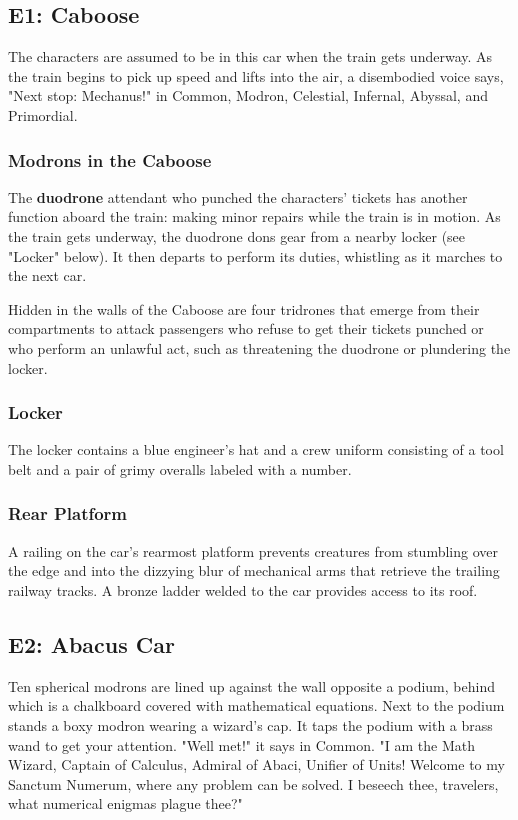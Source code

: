 \documentclass[10pt,a4paper,twoside,bg=print,twocolumn,openany,nodeprecatedcode]{dndarticle}
\begin{document}
\subsection{E1: Caboose}
The characters are assumed to be in this car when the train gets underway. As the train begins to pick up speed and lifts into the air, a disembodied voice says, "Next stop: Mechanus!" in Common, Modron, Celestial, Infernal, Abyssal, and Primordial.

\subsubsection{Modrons in the Caboose}
The \textbf{duodrone} attendant who punched the characters' tickets has another function aboard the train: making minor repairs while the train is in motion. As the train gets underway, the duodrone dons gear from a nearby locker (see "Locker" below). It then departs to perform its duties, whistling as it marches to the next car.

Hidden in the walls of the Caboose are four tridrones that emerge from their compartments to attack passengers who refuse to get their tickets punched or who perform an unlawful act, such as threatening the duodrone or plundering the locker.

\subsubsection{Locker}
The locker contains a blue engineer's hat and a crew uniform consisting of a tool belt and a pair of grimy overalls labeled with a number.

\subsubsection{Rear Platform}
A railing on the car's rearmost platform prevents creatures from stumbling over the edge and into the dizzying blur of mechanical arms that retrieve the trailing railway tracks. A bronze ladder welded to the car provides access to its roof.

\subsection{E2: Abacus Car}
\begin{DndReadAloud}{}
Ten spherical modrons are lined up against the wall opposite a podium, behind which is a chalkboard covered with mathematical equations. Next to the podium stands a boxy modron wearing a wizard's cap. It taps the podium with a brass wand to get your attention. "Well met!" it says in Common. "I am the Math Wizard, Captain of Calculus, Admiral of Abaci, Unifier of Units! Welcome to my Sanctum Numerum, where any problem can be solved. I beseech thee, travelers, what numerical enigmas plague thee?"

\end{DndReadAloud}
\end{document}
